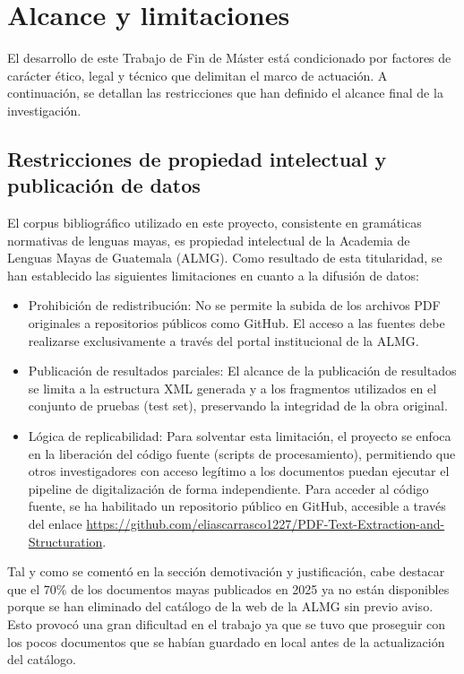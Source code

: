 \section{Alcance y limitaciones}

El desarrollo de este Trabajo de Fin de Máster está condicionado por factores de carácter ético, legal y técnico que delimitan el marco de actuación. A continuación, se detallan las restricciones que han definido el alcance final de la investigación.

\subsection{ Restricciones de propiedad intelectual y publicación de datos}

El corpus bibliográfico utilizado en este proyecto, consistente en gramáticas normativas de lenguas mayas, es propiedad intelectual de la Academia de Lenguas Mayas de Guatemala (ALMG). Como resultado de esta titularidad, se han establecido las siguientes limitaciones en cuanto a la difusión de datos:

\begin{itemize}
    \item Prohibición de redistribución: No se permite la subida de los archivos PDF originales a repositorios públicos como GitHub. El acceso a las fuentes debe realizarse exclusivamente a través del portal institucional de la ALMG.
    \item Publicación de resultados parciales: El alcance de la publicación de resultados se limita a la estructura XML generada y a los fragmentos utilizados en el conjunto de pruebas (test set), preservando la integridad de la obra original.
    \item Lógica de replicabilidad: Para solventar esta limitación, el proyecto se enfoca en la liberación del código fuente (scripts de procesamiento), permitiendo que otros investigadores con acceso legítimo a los documentos puedan ejecutar el pipeline de digitalización de forma independiente. Para acceder al código fuente, se ha habilitado un repositorio público en GitHub, accesible a través del enlace \url{https://github.com/eliascarrasco1227/PDF-Text-Extraction-and-Structuration}.
\end{itemize}

Tal y como se comentó en la sección demotivación y justificación, cabe destacar que el 70\% de los documentos mayas publicados en 2025 ya no están disponibles porque se han eliminado del catálogo de la web de la ALMG sin previo aviso. Esto provocó una gran dificultad en el trabajo ya que se tuvo que proseguir con los pocos documentos que se habían guardado en local antes de la actualización del catálogo.


